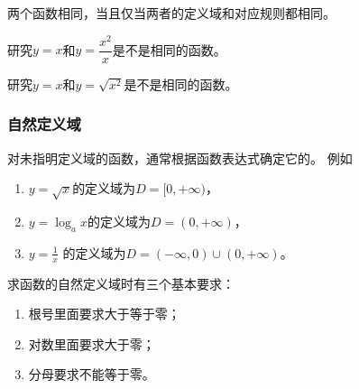 \documentclass[14pt,notheorems,leqno,xcolor={rgb}]{beamer} %
\begin{document}
\begin{frame}
\begin{remark*}
两个函数相同，当且仅当两者的定义域和对应规则都相同。
\end{remark*}
\pause
\begin{example}
研究$y=x$和$y=\dfrac{x^2}x$是不是相同的函数。
\end{example}
\pause
\begin{example}
研究$y=x$和$y=\sqrt{x^2}$是不是相同的函数。
\end{example}
\end{frame}

%

\begin{frame}
\frametitle{自然定义域}
对未指明定义域的函数，通常根据函数表达式确定它的。
例如
\begin{enumerate}[<+->]
\item $y=\sqrt{x}$的定义域为$D=[0,+\infty)$，
\item $y=\log_a{x}$的定义域为$D=(0,+\infty)$，
\item $y=\frac1{x}$ 的定义域为$D=(-\infty,0)\cup(0,+\infty)$。
\end{enumerate}
\onslide<+->
求函数的自然定义域时有三个基本要求：
\begin{enumerate}[<+->]
  \item 根号里面要求大于等于零；
  \item 对数里面要求大于零；
  \item 分母要求不能等于零。
\end{enumerate}
\end{frame}
\end{document}
